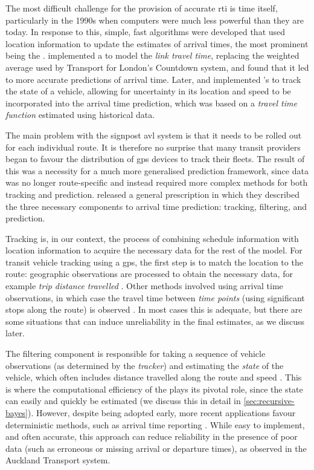The most difficult challenge for the provision of accurate \gls{rti} is time itself, particularly in the 1990s when computers were much less powerful than they are today. In response to this, simple, fast algorithms were developed that used \rt{} location information to update the estimates of arrival times, the most prominent being the \kf{}. \cite{Reinhoudt_1997} implemented a \kf{} to model the \emph{link travel time}, replacing the weighted average used by Transport for London's Countdown system, and found that it led to more accurate predictions of arrival time. Later, \cite{Wall_1999} and \cite{Dailey_2001} implemented \kf{}'s to track the state of a vehicle, allowing for uncertainty in its location and speed to be incorporated into the arrival time prediction, which was based on a \emph{travel time function} estimated using historical data.



The main problem with the signpost \gls{avl} system is that it needs to be rolled out for each individual route. It is therefore no surprise that many transit providers began to favour the distribution of \gls{gps} devices to track their fleets. The result of this was a necessity for a much more generalised prediction framework, since data was no longer route-specific and instead required more complex methods for both tracking and prediction. \Cite{Cathey_2003} released a general prescription in which they described the three necessary components to arrival time prediction: tracking, filtering, and prediction.


Tracking is, in our context, the process of combining schedule information with \rt{} location information to acquire the necessary data for the rest of the model. For transit vehicle tracking using a \gls{gps}, the first step is to match the location to the route: geographic observations are processed to obtain the necessary data, for example \emph{trip distance travelled} \citep{Cathey_2003,Gong_2013}. Other methods involved using arrival time observations, in which case the travel time between \emph{time points} (using significant stops along the route) is observed \citep{Shalaby_2004,Jeong_2005,Yu_2011}. In most cases this is adequate, but there are some situations that can induce unreliability in the final estimates, as we discuss later.


The filtering component is responsible for taking a sequence of vehicle observations (as determined by the \emph{tracker}) and estimating the \emph{state} of the vehicle, which often includes distance travelled along the route and speed \citep{Dailey_2001,Cathey_2003}. This is where the computational efficiency of the \kf{} plays its pivotal role, since the state can easily and quickly be estimated (we discuss this in detail in \cref{sec:recursive-bayes}). However, despite being adopted early, more recent applications favour deterministic methods, such as arrival time reporting \citep{Yin_2017,Cats_2015,Cats_2016}. While easy to implement, and often accurate, this approach can reduce reliability in the presence of poor data (such as erroneous or missing arrival or departure times), as observed in the Auckland Transport system.


